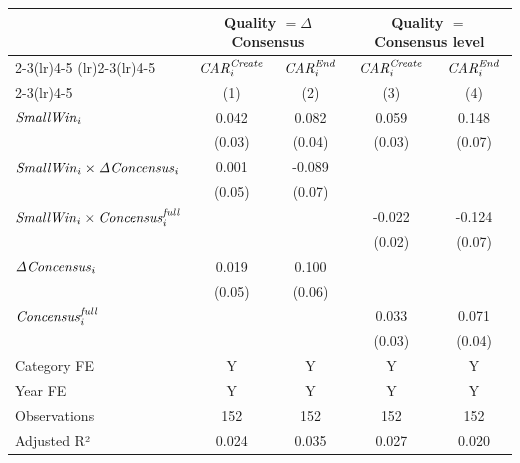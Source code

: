 {
\def\sym#1{\ifmmode^{#1}\else\(^{#1}\)\fi}
\begin{tabular}{l*{4}{c}}
\toprule
                    &\multicolumn{2}{c}{Quality $=\Delta$ Consensus}&\multicolumn{2}{c}{Quality $=$ Consensus level}\\\cmidrule(lr){2-3}\cmidrule(lr){4-5}
\cmidrule(lr){2-3}\cmidrule(lr){4-5} & \multicolumn{1}{c}{${\it CAR}^{\it Create}_{i}$} & \multicolumn{1}{c}{${\it CAR}^{\it End}_{i}$} & \multicolumn{1}{c}{${\it CAR}^{\it Create}_{i}$} & \multicolumn{1}{c}{${\it CAR}^{\it End}_{i}$} \\ \cmidrule(lr){2-3}\cmidrule(lr){4-5} & \multicolumn{1}{c}{(1)} & \multicolumn{1}{c}{(2)} & \multicolumn{1}{c}{(3)} & \multicolumn{1}{c}{(4)} \\ \midrule
${\it Small Win}_{i}$&       0.042         &       0.082         &       0.059         &       0.148         \\
                    &      (0.03)         &      (0.04)         &      (0.03)         &      (0.07)         \\
${\it Small Win}_{i} \times {\it \Delta Concensus}_{i}$&       0.001         &      -0.089         &                     &                     \\
                    &      (0.05)         &      (0.07)         &                     &                     \\
${\it Small Win}_{i} \times {\it Concensus}^{\it full}_{i}$&                     &                     &      -0.022         &      -0.124         \\
                    &                     &                     &      (0.02)         &      (0.07)         \\
${\it \Delta Concensus}_{i}$&       0.019         &       0.100         &                     &                     \\
                    &      (0.05)         &      (0.06)         &                     &                     \\
${\it Concensus}^{\it full}_{i}$&                     &                     &       0.033         &       0.071         \\
                    &                     &                     &      (0.03)         &      (0.04)         \\
\midrule
Category FE         &           Y         &           Y         &           Y         &           Y         \\
Year FE             &           Y         &           Y         &           Y         &           Y         \\
Observations        &         152         &         152         &         152         &         152         \\
Adjusted R²         &       0.024         &       0.035         &       0.027         &       0.020         \\
\bottomrule
\end{tabular}
}
